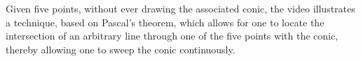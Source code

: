 Given five points, without ever drawing the associated conic, the video illustrates a technique, based on Pascal's theorem, which allows for one to locate the intersection of an arbitrary line through one of the five points with the conic, thereby allowing one to sweep the conic continuously.